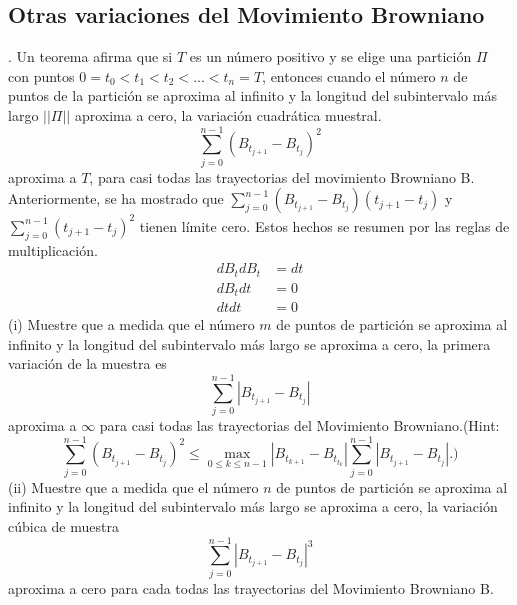 \documentclass[11pt,notitlepage]{article}
\begin{document}
\subsection{Otras variaciones del Movimiento Browniano}. Un teorema afirma que si \(T\) es un número positivo y se elige una partición $\Pi$ con puntos $0=t_{0}<t_{1}<t_{2}<...<t_{n}=T$, entonces cuando el número $n$ de puntos de la partición se aproxima al infinito y la longitud del subintervalo más largo $||\Pi||$ aproxima a cero, la variación cuadrática muestral.
\begin{equation*}
    \sum_{j=0}^{n-1}(B_{t_{j+1}}-B_{t_{j}})^{2}
\end{equation*}
\hspace{0.3cm} aproxima a $T$, para casi todas las trayectorias del movimiento Browniano B. Anteriormente, se ha mostrado que $\sum\nolimits_{j=0}^{n-1}(B_{t_{j+1}}-B_{t_{j}})(t_{j+1}-t_{j})$ y $\sum\nolimits_{j=0}^{n-1}(t_{j+1}-t_{j})^{2}$ tienen límite cero. Estos hechos se resumen por las reglas de multiplicación.
\begin{align*}
    dB_tdB_t&=dt \\
    dB_tdt&=0 \\
    dtdt&=0
\end{align*}
\hspace{0.3cm} (i) Muestre que a medida que el número $m$ de puntos de partición se aproxima al infinito y la longitud del subintervalo más largo se aproxima a cero, la primera variación de la muestra es
\begin{equation*}
    \sum_{j=0}^{n-1}|B_{t_{j+1}}-B_{t_{j}}|
\end{equation*}
\hspace{0.3cm} aproxima a $\infty$ para casi todas las trayectorias del Movimiento Browniano.(Hint:
\begin{equation*}
        \sum_{j=0}^{n-1}(B_{t_{j+1}}-B_{t_{j}})^{2}
    \leq \max_{0\leq k\leq n-1}|B_{t_{k+1}}-B_{t_{t_{k}}}|\sum_{j=0}^{n-1}|B_{t_{j+1}}-B_{t_{j}}|.)
\end{equation*}
\hspace{0.3cm} (ii) Muestre que a medida que el número $n$ de puntos de partición se aproxima al infinito y la longitud del subintervalo más largo se aproxima a cero, la variación cúbica de muestra
\begin{equation*}
    \sum_{j=0}^{n-1}|B_{t_{j+1}}-B_{t_{j}}|^{3}
\end{equation*}
\hspace{0.3cm} aproxima a cero para cada todas las trayectorias del Movimiento Browniano B.
\end{document}
